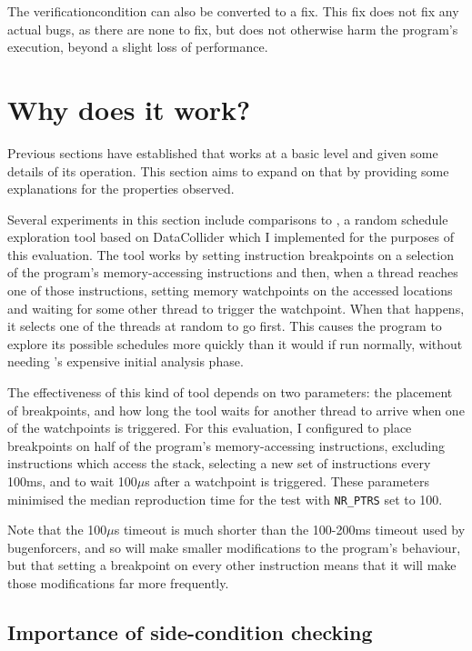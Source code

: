 The \gls{verificationcondition} can also be converted to a fix.  This
fix does not fix any actual bugs, as there are none to fix, but does
not otherwise harm the program's execution, beyond a slight loss of
performance.

\section{Why does it work?}
\label{sect:eval:why_does_it_work}

Previous sections have established that {\technique} works at a basic
level and given some details of its operation.  This section aims to
expand on that by providing some explanations for the properties
observed.

Several experiments in this section include comparisons to
{\randsched}, a random schedule exploration tool based on
DataCollider\cite{Erickson2010} which I implemented for the purposes
of this evaluation.  The tool works by setting instruction breakpoints
on a selection of the program's memory-accessing instructions and
then, when a thread reaches one of those instructions, setting memory
watchpoints on the accessed locations and waiting for some other
thread to trigger the watchpoint.  When that happens, it selects one
of the threads at random to go first.  This causes the program to
explore its possible schedules more quickly than it would if run
normally, without needing {\technique}'s expensive initial analysis
phase.

The effectiveness of this kind of tool depends on two parameters: the
placement of breakpoints, and how long the tool waits for another
thread to arrive when one of the watchpoints is triggered.  For this
evaluation, I configured {\randsched} to place breakpoints on half of
the program's memory-accessing instructions, excluding instructions
which access the stack, selecting a new set of instructions every
100ms, and to wait 100$\mu$s after a watchpoint is triggered.  These
parameters minimised the median reproduction time for the
 test with \texttt{NR\_PTRS} set to 100.

Note that the 100$\mu$s timeout is much shorter than the 100-200ms
timeout used by {\technique} \glspl{bugenforcer}, and so {\randsched}
will make smaller modifications to the program's behaviour, but that
setting a breakpoint on every other instruction means that it will
make those modifications far more frequently.

\subsection{Importance of side-condition checking}

